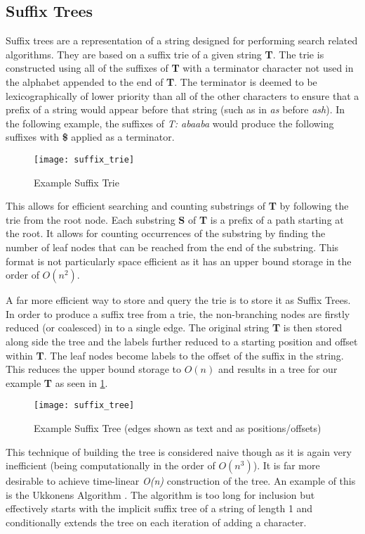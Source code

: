 \documentclass[../report.tex]{subfiles}
\begin{document}
\subsection{Suffix Trees}
	Suffix trees \citep{suffix} are a representation of a string designed for performing search related algorithms.  They are based on a suffix trie of a given string \textbf{T}.  The trie is constructed using all of the suffixes of \textbf{T} with a terminator character not used in the alphabet appended to the end of \textbf{T}.  The terminator is deemed to be lexicographically of lower priority than all of the other characters to ensure that a prefix of a string would appear before that string (such as in \textit{as} before \textit{ash}).  In the following example, the suffixes of \textit{T: abaaba} would produce the following suffixes with \textbf{\$} applied as a terminator.
	\begin{figure}[ht]
		\centering
		\texttt{[image: suffix\_trie]}
		\caption{Example Suffix Trie}
	\end{figure}
	
	This allows for efficient searching and counting substrings of \textbf{T} by following the trie from the root node.  Each substring \textbf{S} of \textbf{T} is a prefix of a path starting at the root.  It allows for counting occurrences of the substring by finding the number of leaf nodes that can be reached from the end of the substring.  This format is not particularly space efficient as it has an upper bound storage in the order of \textit{$O(n^{2})$}.
	
	A far more efficient way to store and query the trie is to store it as Suffix Trees.  In order to produce a suffix tree from a trie, the non-branching nodes are firstly reduced (or coalesced) in to a single edge.  The original string \textbf{T} is then stored along side the tree and the labels further reduced to a starting position and offset within \textbf{T}.  The leaf nodes become labels to the offset of the suffix in the string.  This reduces the upper bound storage to \textit{$O(n)$} and results in a tree for our example \textbf{T} as seen in \cref{fig:tree}.
	\begin{figure}[ht]
		\label{fig:tree}
		\centering
		\texttt{[image: suffix\_tree]}
		\caption{Example Suffix Tree (edges shown as text and as positions/offsets)}
	\end{figure}
	
	This technique of building the tree is considered naive though as it is again very inefficient (being computationally in the order of \textit{$O(n^{3})$}).  It is far more desirable to achieve time-linear \textit{O(n)} construction of the tree.  An example of this is the Ukkonens Algorithm \citep{ukkonens}.  The algorithm is too long for inclusion but effectively starts with the implicit suffix tree of a string of length 1 and conditionally extends the tree on each iteration of adding a character.
	
\end{document}
